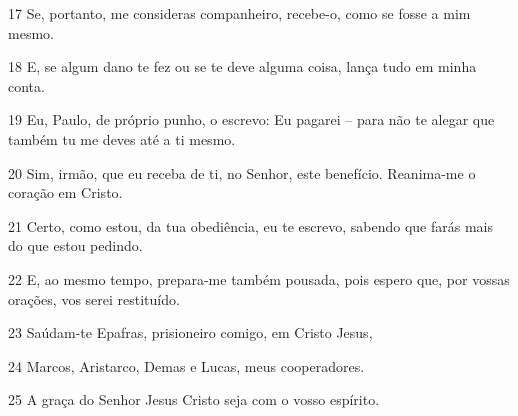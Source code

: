 \par 17 Se, portanto, me consideras companheiro, recebe-o, como se fosse a mim mesmo.
\par 18 E, se algum dano te fez ou se te deve alguma coisa, lança tudo em minha conta.
\par 19 Eu, Paulo, de próprio punho, o escrevo: Eu pagarei -- para não te alegar que também tu me deves até a ti mesmo.
\par 20 Sim, irmão, que eu receba de ti, no Senhor, este benefício. Reanima-me o coração em Cristo.
\par 21 Certo, como estou, da tua obediência, eu te escrevo, sabendo que farás mais do que estou pedindo.
\par 22 E, ao mesmo tempo, prepara-me também pousada, pois espero que, por vossas orações, vos serei restituído.
\par 23 Saúdam-te Epafras, prisioneiro comigo, em Cristo Jesus,
\par 24 Marcos, Aristarco, Demas e Lucas, meus cooperadores.
\par 25 A graça do Senhor Jesus Cristo seja com o vosso espírito.


